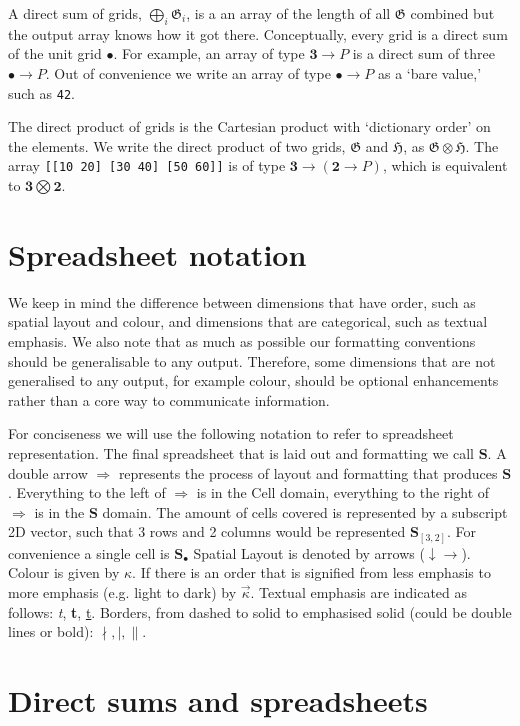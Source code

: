 \documentclass[11pt]{article}
\newcommand{\gr}[1]{\mathfrak{#1}}
\newcommand{\GG}{\gr{G}}
\newcommand{\unit}{\bullet}
\newcommand{\two}{\mathbf{2}}
\newcommand{\three}{\mathbf{3}}
\newcommand{\cell}{\mathbf{S}_\bullet}
\begin{document}
A direct sum of grids, \(\bigoplus_i \GG_i\), is a an array of the length of all \(\GG\) combined but the output array knows how it got there. Conceptually, every grid is a direct sum of the unit grid $\unit$. For example, an array of type $\three \to P$ is a direct sum of three $\unit \to P$. Out of convenience we write an array of type $\unit\to P$ as a `bare value,' such as \verb|42|.

The direct product of grids is the Cartesian product with `dictionary order' on
the elements. We write the direct product of two grids, \(\gr{G}\) and
\(\gr{H}\), as \(\gr{G}\otimes\gr{H}\). The array \verb|[[10 20] [30 40] [50 60]]| is of type $\three \to (\two \to P)$, which is equivalent to $\three \bigotimes \two$. 

\section{Spreadsheet notation}

We keep in mind the difference between dimensions that have order, such as spatial layout and colour, and dimensions that are categorical, such as textual emphasis. We also note that as much as possible our formatting conventions should be generalisable to any output. Therefore, some dimensions that are not generalised to any output, for example colour, should be optional enhancements rather than a core way to communicate information.

For conciseness we will use the following notation to refer to spreadsheet representation. The final spreadsheet that is laid out and formatting we call $\mathbf{S}$. A double arrow $\Rightarrow$ represents the process of layout and formatting that produces $\mathbf{S}$. Everything to the left of $\Rightarrow$ is in the Cell domain, everything to the right of $\Rightarrow$ is in the $\mathbf{S}$ domain. The amount of cells covered is represented by a subscript 2D vector, such that 3 rows and 2 columns would be represented $\mathbf{S}_{[3,2]}$. For convenience a single cell is $\cell$   Spatial Layout is denoted by arrows ($\downarrow \rightarrow$). Colour is given by $\kappa$. If there is an order that is signified from less emphasis to more emphasis (e.g. light to dark) by $\overrightarrow{\kappa}$. Textual emphasis are indicated as follows: \textit{t}, \textbf{t}, \underline{t}. Borders, from dashed to solid to emphasised solid (could be double lines or bold): $\nmid, \mid, \parallel$. 

\section{Direct sums and spreadsheets} 
\end{document}

